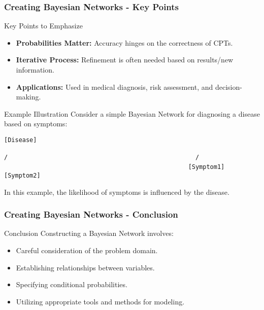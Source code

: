\documentclass[aspectratio=169]{beamer}
\begin{document}
\begin{frame}[fragile]
    \frametitle{Creating Bayesian Networks - Key Points}
    \begin{block}{Key Points to Emphasize}
        \begin{itemize}
            \item \textbf{Probabilities Matter:} Accuracy hinges on the correctness of CPTs.
            \item \textbf{Iterative Process:} Refinement is often needed based on results/new information.
            \item \textbf{Applications:} Used in medical diagnosis, risk assessment, and decision-making.
        \end{itemize}
    \end{block}

    \begin{block}{Example Illustration}
        Consider a simple Bayesian Network for diagnosing a disease based on symptoms:
        \begin{center}
            \texttt{[Disease]}
            \begin{center}
                \texttt{/ \ \ \ \ \ \ \ \ \ \ \ \ \ \ \ \ \ \ \ \ \ \ \ \ \ \ \ \ \ \ \ \ \ \ \ \ \ \ \ \ \ \ \ \ \ \ \ \ \ \ }
                \texttt{/ \ \ \ \ \ \ \ \ \ \ \ \ \ \ \ \ \ \ \ \ \ \ \ \ \ \ \ \ \ \ \ \ \ \ \ \ \ \ \ \ \ \ \ \ \ \ \ \ \ \ }
                \texttt{[Symptom1] \hspace{2cm} [Symptom2]}
            \end{center}
        \end{center}
        In this example, the likelihood of symptoms is influenced by the disease.
    \end{block}
\end{frame}

\begin{frame}[fragile]
    \frametitle{Creating Bayesian Networks - Conclusion}
    \begin{block}{Conclusion}
        Constructing a Bayesian Network involves:
        \begin{itemize}
            \item Careful consideration of the problem domain.
            \item Establishing relationships between variables.
            \item Specifying conditional probabilities.
            \item Utilizing appropriate tools and methods for modeling.
        \end{itemize}
    \end{block}
\end{frame}
\end{document}
